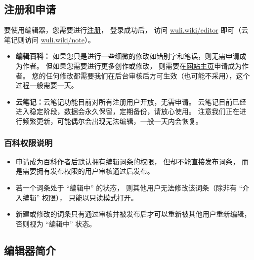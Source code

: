 \subsection{注册和申请}
要使用编辑器，您需要进行\href{https://wuli.wiki/forum}{注册}， 登录成功后， 访问 \href{https://wuli.wiki/editor/}{wuli.wiki/editor} 即可（云笔记则访问 \href{https://wuli.wiki/note/}{wuli.wiki/note}）。
\begin{itemize}
\item \textbf{编辑百科：} 如果您只是进行一些细微的修改如错别字和笔误，则无需申请成为作者。 但如果您需要进行更多创作或修改， 则需要在\href{https://wuli.wiki}{网站主页}申请成为作者。 您的任何修改都需要我们在后台审核后方可生效（也可能不采用），这个过程一般需要一天。
\item \textbf{云笔记：}云笔记功能目前对所有注册用户开放，无需申请。 云笔记目前已经进入稳定阶段，数据会永久保留，定期备份，请放心使用。 注意我们正在进行频繁更新，可能偶尔会出现无法编辑，一般一天内会恢复。
\end{itemize}

\subsubsection{百科权限说明}
\begin{itemize}
\item 申请成为百科作者后默认拥有编辑词条的权限， 但却不能直接发布词条， 而是需要拥有发布权限的用户审核通过后发布。
\item 若一个词条处于 “编辑中” 的状态， 则其他用户无法修改该词条（除非有 “介入编辑” 权限）， 只能以只读模式打开。
\item 新建或修改的词条只有通过审核并被发布后才可以重新被其他用户重新编辑， 否则视为 “编辑中” 状态。
\end{itemize}

\subsection{编辑器简介}

